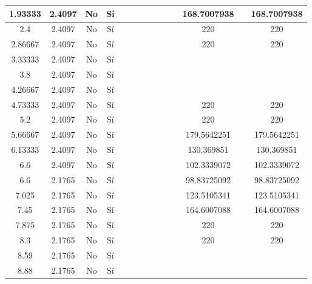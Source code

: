 \begin{table}[H]
{\begin{tabular}{|c|c|c|c|c|c|c|c|c|c|c|c|c|c|}
\hline
1.93333 & 2.4097 & No  & Sí  &     &     &     &     &     &     &     & 168.7007938 &     & 168.7007938 \bigstrut\\
\hline
2.4 & 2.4097 & No  & Sí  &     &     &     &     &     &     &     & 220 &     & 220 \bigstrut\\
\hline
2.86667 & 2.4097 & No  & Sí  &     &     &     &     &     &     &     & 220 &     & 220 \bigstrut\\
\hline
3.33333 & 2.4097 & No  & Sí  &     &     &     &     &     &     &     &     &     &  \bigstrut\\
\hline
3.8 & 2.4097 & No  & Sí  &     &     &     &     &     &     &     &     &     &  \bigstrut\\
\hline
4.26667 & 2.4097 & No  & Sí  &     &     &     &     &     &     &     &     &     &  \bigstrut\\
\hline
4.73333 & 2.4097 & No  & Sí  &     &     &     &     &     &     &     & 220 &     & 220 \bigstrut\\
\hline
5.2 & 2.4097 & No  & Sí  &     &     &     &     &     &     &     & 220 &     & 220 \bigstrut\\
\hline
5.66667 & 2.4097 & No  & Sí  &     &     &     &     &     &     &     & 179.5642251 &     & 179.5642251 \bigstrut\\
\hline
6.13333 & 2.4097 & No  & Sí  &     &     &     &     &     &     &     & 130.369851 &     & 130.369851 \bigstrut\\
\hline
6.6 & 2.4097 & No  & Sí  &     &     &     &     &     &     &     & 102.3339072 &     & 102.3339072 \bigstrut\\
\hline
6.6 & 2.1765 & No  & Sí  &     &     &     &     &     &     &     & 98.83725092 &     & 98.83725092 \bigstrut\\
\hline
7.025 & 2.1765 & No  & Sí  &     &     &     &     &     &     &     & 123.5105341 &     & 123.5105341 \bigstrut\\
\hline
7.45 & 2.1765 & No  & Sí  &     &     &     &     &     &     &     & 164.6007088 &     & 164.6007088 \bigstrut\\
\hline
7.875 & 2.1765 & No  & Sí  &     &     &     &     &     &     &     & 220 &     & 220 \bigstrut\\
\hline
8.3 & 2.1765 & No  & Sí  &     &     &     &     &     &     &     & 220 &     & 220 \bigstrut\\
\hline
8.59 & 2.1765 & No  & Sí  &     &     &     &     &     &     &     &     &     &  \bigstrut\\
\hline
8.88 & 2.1765 & No  & Sí  &     &     &     &     &     &     &     &     &     &  \bigstrut\\

\end{tabular}}
\end{table}
